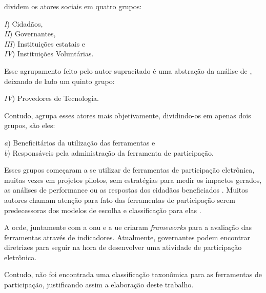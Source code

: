 \par
{} dividem os atores sociais em quatro grupos: 

\begin{minipage}{.66\textwidth}	
   \textit{I}) Cidadãos, \\
   \textit{II}) Governantes, \\
   \textit{III}) Instituições estatais e \\
   \textit{IV}) Instituições Voluntárias. \\
\end{minipage}

\par
Esse agrupamento feito pelo autor supracitado é uma abstração da análise de , deixando de lado um quinto grupo:

\par
\textit{IV}) Provedores de Tecnologia.

\par
Contudo,  agrupa esses atores mais objetivamente, dividindo-os em apenas dois grupos, são eles:\\

\begin{minipage}{.75\textwidth}	
   \textit{a}) Beneficitários da utilização das ferramentas e \\
   \textit{b}) Responsáveis pela administração da ferramenta de participação.  \\
\end{minipage}

Esses grupos começaram a se utilizar de ferramentas de participação eletrônica, muitas vezes em projetos pilotos,
sem estratégias para medir os impactos gerados, as análises de performance ou as respostas dos cidadãos beneficiados \cite{macintosh2008democracy}.
Muitos autores chamam atenção para fato das ferramentas de participação serem predecessoras dos modelos de escolha e classificação para elas 
\cite{millard2006egovernance,macintosh2008democracy,reddick2012public}.

\par
A \acrfull{ocde}, juntamente com a \acrshort{onu} e a \acrfull{ue} criaram \textit{frameworks} para a avaliação das ferramentas através de indicadores. 
Atualmente, governantes podem encontrar diretrizes para seguir na hora de desenvolver uma atividade de participação eletrônica.

\par
Contudo, não foi encontrada uma classificação taxonômica para as ferramentas de participação, justificando assim a elaboração deste trabalho.

